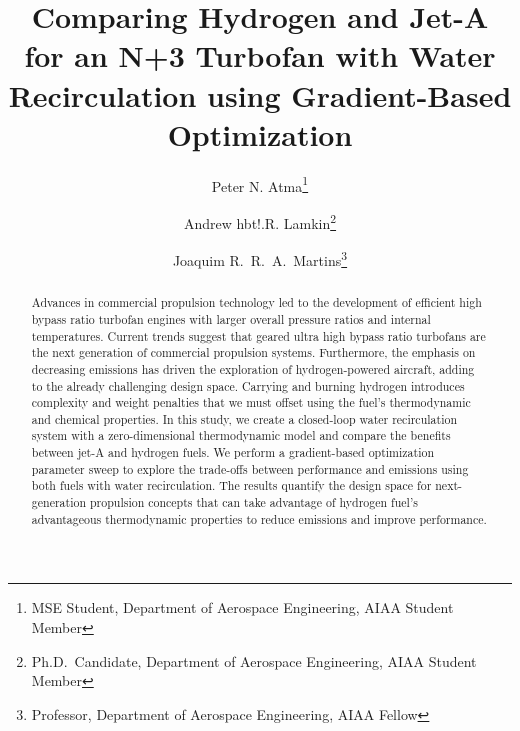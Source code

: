 \documentclass[conf]{new-aiaa}
\title{Comparing Hydrogen and Jet-A for an N+3 Turbofan with Water Recirculation using Gradient-Based Optimization} %
\author{Peter N. Atma\footnote{MSE Student, Department of Aerospace Engineering, AIAA Student Member}}
\author{Andrew hbt!.R. Lamkin\footnote{Ph.D.~Candidate, Department of Aerospace Engineering, AIAA Student Member}}
\author{Joaquim R.~R.~A.~Martins\footnote{Professor, Department of Aerospace Engineering, AIAA Fellow}}
\affil{University of Michigan, Ann Arbor, MI, 48109}
\begin{document}
\maketitle

\begin{abstract}
    Advances in commercial propulsion technology led to the development of efficient high bypass ratio turbofan engines with larger overall pressure ratios and internal temperatures.
    Current trends suggest that geared ultra high bypass ratio turbofans are the next generation of commercial propulsion systems.
    Furthermore, the emphasis on decreasing emissions has driven the exploration of hydrogen-powered aircraft, adding to the already challenging design space.
    Carrying and burning hydrogen introduces complexity and weight penalties that we must offset using the fuel's thermodynamic and chemical properties.
    In this study, we create a closed-loop water recirculation system with a zero-dimensional thermodynamic model and compare the benefits between jet-A and hydrogen fuels.
    We perform a gradient-based optimization parameter sweep to explore the trade-offs between performance and emissions using both fuels with water recirculation.
    The results quantify the design space for next-generation propulsion concepts that can take advantage of hydrogen fuel's advantageous thermodynamic properties to reduce emissions and improve performance.
\end{abstract}
\end{document}
